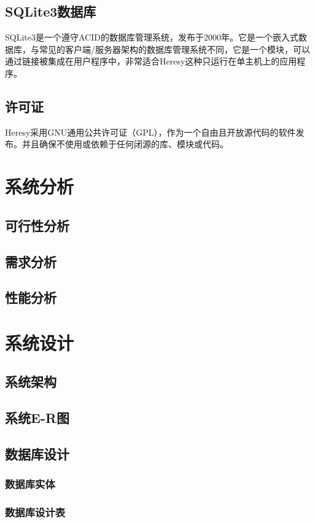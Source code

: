 \documentclass[12pt,a4paper]{article}%
\begin{document}
\subsection{SQLite3数据库}
SQLite3是一个遵守ACID的数据库管理系统，发布于2000年。它是一个嵌入式数据库，与常见的客户端/服务器架构的数据库管理系统不同，它是一个模块，可以通过链接被集成在用户程序中，非常适合Heresy这种只运行在单主机上的应用程序。

\subsection{许可证}
Heresy采用GNU通用公共许可证（GPL），作为一个自由且开放源代码的软件发布。并且确保不使用或依赖于任何闭源的库、模块或代码。

\newpage

\section{系统分析}
\subsection{可行性分析}
\subsection{需求分析}
\subsection{性能分析}

\newpage

\section{系统设计}
\subsection{系统架构}
\subsection{系统E-R图}
\subsection{数据库设计}
\subsubsection{数据库实体}
\subsubsection{数据库设计表}
\end{document}
